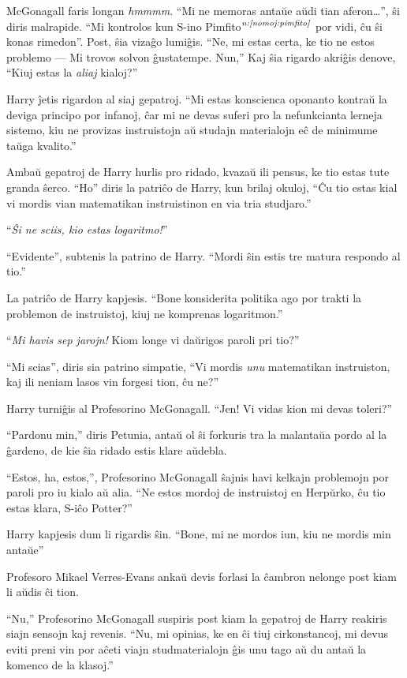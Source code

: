 McGonagall faris longan \emph{hmmmm}. ``Mi ne memoras antaŭe aŭdi tian
aferon\ldots{}'', ŝi diris malrapide. ``Mi kontrolos kun S-ino
Pimfito$^{\textit{n:\ref{nomoj:pimfito}}}$ por vidi, ĉu ŝi konas rimedon''.
Post, ŝia vizaĝo lumiĝis. ``Ne, mi estas certa, ke tio ne estos problemo — Mi
trovos solvon ĝustatempe. Nun,'' Kaj ŝia rigardo akriĝis denove, ``Kiuj estas la
\emph{aliaj} kialoj?''

Harry ĵetis rigardon al siaj gepatroj. ``Mi estas konscienca oponanto kontraŭ la
deviga principo por infanoj, ĉar mi ne devas suferi pro la nefunkcianta lerneja
sistemo, kiu ne provizas instruistojn aŭ studajn materialojn eĉ de minimume
taŭga kvalito.''

Ambaŭ gepatroj de Harry hurlis pro ridado, kvazaŭ ili pensus, ke tio estas tute
granda ŝerco. ``Ho'' diris la patriĉo de Harry, kun brilaj okuloj, ``Ĉu tio
estas kial vi mordis vian matematikan instruistinon en via tria studjaro.''

``\emph{Ŝi ne sciis, kio estas logaritmo!}''

``Evidente'', subtenis la patrino de Harry. ``Mordi ŝin estis tre matura respondo al tio.''

La patriĉo de Harry kapjesis. ``Bone konsiderita politika ago por trakti la
problemon de instruistoj, kiuj ne komprenas logaritmon.''

``\emph{Mi havis sep jarojn!} Kiom longe vi daŭrigos paroli pri tio?''

``Mi scias'', diris sia patrino simpatie, ``Vi mordis \emph{unu} matematikan
instruiston, kaj ili neniam lasos vin forgesi tion, ĉu ne?''

Harry turniĝis al Profesorino McGonagall. ``Jen! Vi vidas kion mi devas toleri?''

``Pardonu min,'' diris Petunia, antaŭ ol ŝi forkuris tra la malantaŭa pordo al
la ĝardeno, de kie ŝia ridado estis klare aŭdebla.

``Estos, ha, estos,'', Profesorino McGonagall ŝajnis havi kelkajn problemojn por
paroli pro iu kialo aŭ alia. ``Ne estos mordoj de instruistoj en Herpŭrko, ĉu
tio estas klara, S-iĉo Potter?''

Harry kapjesis dum li rigardis ŝin. ``Bone, mi ne mordos iun, kiu ne mordis min antaŭe''

Profesoro Mikael Verres-Evans ankaŭ devis forlasi la ĉambron nelonge post kiam
li aŭdis ĉi tion.

``Nu,'' Profesorino McGonagall suspiris post kiam la gepatroj de Harry reakiris
siajn sensojn kaj revenis. ``Nu, mi opinias, ke en ĉi tiuj cirkonstancoj, mi
devus eviti preni vin por aĉeti viajn studmaterialojn ĝis unu tago aŭ du antaŭ
la komenco de la klasoj.''

